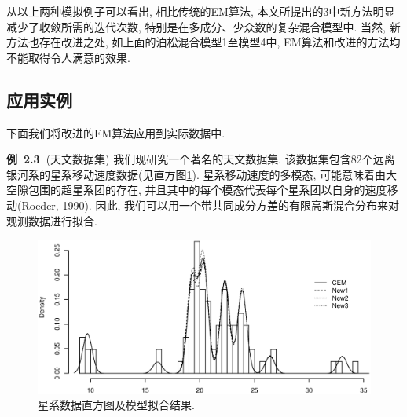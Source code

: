 \documentclass[a4paper,12pt,openany,oneside,utf-8]{ctexbook}
\newcommand{\xiaosihao}{\fontsize{12pt}{\baselineskip}\selectfont}
\begin{document}
从以上两种模拟例子可以看出, 相比传统的EM算法, 本文所提出的3中新方法明显减少了收敛所需的迭代次数, 特别是在多成分、少众数的复杂混合模型中. 当然, 新方法也存在改进之处, 如上面的泊松混合模型1至模型4中, EM算法和改进的方法均不能取得令人满意的效果.

\subsection{应用实例}
下面我们将改进的EM算法应用到实际数据中.

\textbf{\xiaosihao 例~2.3~}(天文数据集)
我们现研究一个著名的天文数据集. 该数据集包含82个远离银河系的星系移动速度数据(见直方图\ref{fig:Histogram of the galaxy data. The curves show the density of mixture models selected by AIC/BIC based on different algorithms}). 星系移动速度的多模态, 可能意味着由大空隙包围的超星系团的存在, 并且其中的每个模态代表每个星系团以自身的速度移动(Roeder, 1990). 因此, 我们可以用一个带共同成分方差的有限高斯混合分布来对观测数据进行拟合.

\begin{figure}[htbp]
  \centering
  \includegraphics[width = 1\textwidth]{Figure_8_Figure_of_histogram_N_density_in_Example_Postman1986.eps}
  \caption{星系数据直方图及模型拟合结果.}
  \label{fig:Histogram of the galaxy data. The curves show the density of mixture models selected by AIC/BIC based on different algorithms} %
\end{figure}
\end{document}
